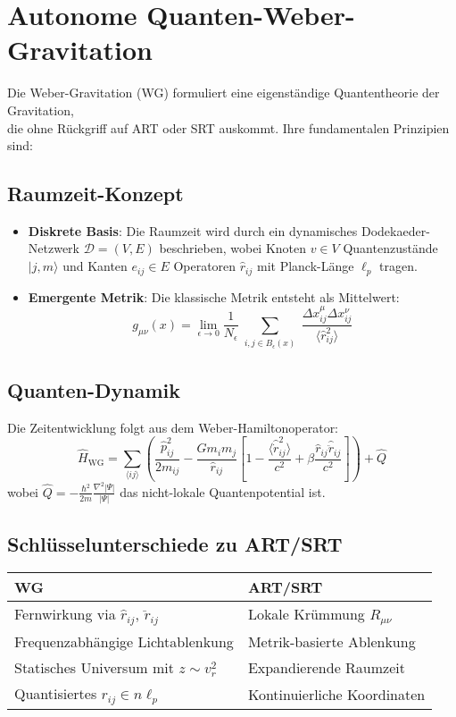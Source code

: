 \section{Autonome Quanten-Weber-Gravitation}
Die Weber-Gravitation (WG) formuliert eine eigenständige Quantentheorie der Gravitation,\\die ohne Rückgriff auf ART oder SRT auskommt. Ihre fundamentalen Prinzipien sind:

\subsection{Raumzeit-Konzept}
\begin{itemize}
    \item \textbf{Diskrete Basis}: Die Raumzeit wird durch ein dynamisches Dodekaeder-Netzwerk $\mathcal{D}=(V,E)$ beschrieben, wobei Knoten $v\in V$ Quantenzustände $|j,m\rangle$ und Kanten $e_{ij}\in E$ Operatoren $\hat{r}_{ij}$ mit Planck-Länge $\ell_p$ tragen.
    
    \item \textbf{Emergente Metrik}: Die klassische Metrik entsteht als Mittelwert:
    \begin{equation}
        g_{\mu\nu}(x) = \lim_{\epsilon\to0} \frac{1}{N_\epsilon} \sum_{\substack{i,j\in B_\epsilon(x)}} \frac{\Delta x_{ij}^\mu \Delta x_{ij}^\nu}{\langle \hat{r}_{ij}^2 \rangle}
    \end{equation}
\end{itemize}

\subsection{Quanten-Dynamik}
Die Zeitentwicklung folgt aus dem Weber-Hamiltonoperator:
\begin{equation}
    \hat{H}_{\text{WG}} = \sum_{\langle ij \rangle} \left( \frac{\hat{p}_{ij}^2}{2m_{ij}} - \frac{Gm_im_j}{\hat{r}_{ij}} \left[1 - \frac{\langle \hat{\dot{r}}_{ij}^2 \rangle}{c^2} + \beta \frac{\hat{r}_{ij}\hat{\ddot{r}}_{ij}}{c^2}\right] \right) + \hat{Q}
\end{equation}
wobei $\hat{Q} = -\frac{\hbar^2}{2m}\frac{\nabla^2|\Psi|}{|\Psi|}$ das nicht-lokale Quantenpotential ist.

\subsection{Schlüsselunterschiede zu ART/SRT}
\begin{tabular}{ll}
    \textbf{WG} & \textbf{ART/SRT} \\
    \hline
    Fernwirkung via $\hat{r}_{ij}$, $\hat{\ddot{r}}_{ij}$ & Lokale Krümmung $R_{\mu\nu}$ \\
    Frequenzabhängige Lichtablenkung & Metrik-basierte Ablenkung \\
    Statisches Universum mit $z\sim v_r^2$ & Expandierende Raumzeit \\
    Quantisiertes $r_{ij}\in n\ell_p$ & Kontinuierliche Koordinaten \\
\end{tabular}

